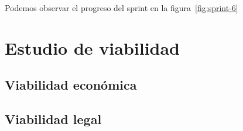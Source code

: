 Podemos observar el progreso del sprint en la figura~\ref{fig:sprint-6}


\section{Estudio de viabilidad}

\subsection{Viabilidad económica}

\subsection{Viabilidad legal}



